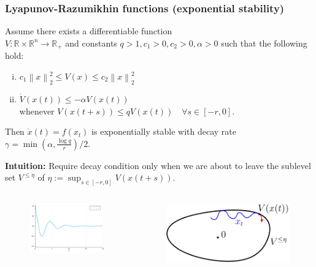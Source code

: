 \documentclass[11pt,aspectratio=169]{beamer}
\newcommand{\norm}[1]{\left\lVert#1\right\rVert}
\newcommand{\R}{\mathbb{R}}
\begin{document}
\begin{frame}[t]
    \frametitle{Lyapunov-Razumikhin functions (exponential stability)} 
    \begin{theorem}[Liu et al, 2012]
    Assume there exists a differentiable function \\$V:\R\times\R^n\to \R_+$ and constants $q>1, c_1>0, c_2>0, \alpha>0$ such that the following hold:
    \begin{enumerate}[(i)]
        \item $c_1 \norm{x}_2^2 \leq V(x) \leq c_2 \norm{x}_2^2$
        \item $\dot{V}(x(t)) \leq -\alpha V(x(t))$\\
        whenever $V(x(t+s))\leq q V(x(t)) \quad\forall s\in [-r,0]$.
    \end{enumerate}
    Then $\dot{x}(t) = f(x_t)$ is exponentially stable with decay rate $\gamma = \min(\alpha, \frac{\log q}{r})/2$.
\end{theorem}
\textbf{Intuition:} Require decay condition only when we are about to leave the sublevel set \;$V^{\leq \eta}$ of \linebreak $\eta := \sup_{s\in [-r,0]} V(x(t+s))$.

\begin{columns}
    \begin{column}{0.5\textwidth}
        \begin{figure}
        \centering
        \includegraphics[width=0.5\columnwidth]{figures/linear_dde.png}
        \end{figure}
    \end{column}
        \begin{column}{0.5\textwidth}
        \hspace{-1cm}\begin{figure}
        \includegraphics[scale=0.15]{figures/sublevelset.png}
        \end{figure} 
    \end{column}
\end{columns}

\end{frame}
\end{document}
